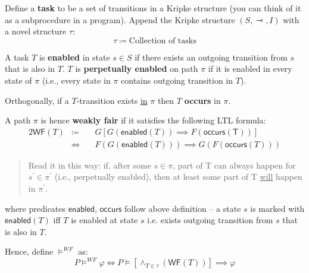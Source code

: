 \documentclass[99-notes-packed.tex]{subfiles}
\begin{document}
\begin{definition}
    Define a \textbf{task} to be a set of transitions in a Kripke structure (you can think of it as a subprocedure in a program). Append the Kripke structure $(S, \rightarrowtriangle, I)$ with a novel structure $\tau$: 
    \begin{equation*}
        \tau \coloneqq \textrm{Collection of tasks}
    \end{equation*}

    A task $T$ is \textbf{enabled} in state $s \in S$ if there exists an outgoing transition from $s$ that is also in $T$. $T$ is \textbf{perpetually enabled} on path $\pi$ if it is enabled in every state of $\pi$ (i.e., every state in $\pi$ contains outgoing transition in $T$). 
    
    Orthogonally, if a $T$-transition exists \underline{in} $\pi$ then $T$ \textbf{occurs} in $\pi$.

    A path $\pi$ is hence \textbf{weakly fair} if it satisfies the following LTL formula:
    \begin{alignat*}{2}
        \mathsf{WF}(T) 
        &\coloneqq &&\ G[G(\mathsf{enabled}(T)) \implies F(\mathsf{occurs(T)})] \\ 
        &\Leftrightarrow &&\ F(G(\mathsf{enabled}(T))) \implies G(F(\mathsf{occurs}(T)))
    \end{alignat*}

    \begin{quote}
        Read it in this way: if, after some $s \in \pi$, part of T can always happen for $s^{'} \in \pi^{'}$ (i.e., perpetually enabled), then at least some part of T \underline{will} happen in $\pi^{'}$.
    \end{quote}

    where predicates $\mathsf{enabled}$, $\mathsf{occurs}$ follow above definition -- a state $s$ is marked with $\mathsf{enabled}(T)$ iff $T$ is enabled at state $s$ i.e. exists outgoing transition from $s$ that is also in $T$.

    Hence, define $\models^{WF}$ as: 
    \begin{equation*}
        P \models^{WF} \varphi \iff P \models [\wedge_{T \in \tau} {(\mathsf{WF}(T))}] \implies \varphi
    \end{equation*}
\end{definition}
\end{document}
